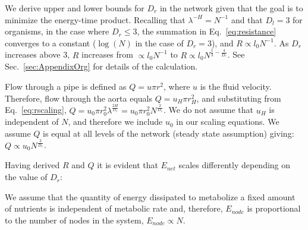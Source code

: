 \documentclass[12pt]{article}
\begin{document}
We derive upper and lower bounds for $D_r$ in the network given that the goal
is to minimize the energy-time product.  Recalling that $\lambda^{-H} = N^{-1}$
and that $D_l = 3$ for organisms, in the case where $D_r \leq 3$, the summation
in Eq.~\ref{eq:resistance} converges to a constant ($\log(N)$ in the case of
$D_r=3$), and $R \propto l_0 N^{-1}$. As $D_r$ increases above 3, $R$
increases from $\propto l_0 N^{-1}$ to $R \propto l_0 N^{\frac{1}{3} -
\frac{4}{D_r}}$. 
See Sec.~\ref{sec:AppendixOrg} for
details of the calculation.

Flow through a pipe is defined as $Q = u\pi r^2$, where $u$ is the fluid
velocity. 
Therefore, flow through the aorta equals $Q = u_H \pi r_{H}^2$, and
substituting from Eq.~\ref{eq:rscaling}, $Q = u_0 \pi r_0^2
\lambda^{\frac{2H}{D_r}} = u_0 \pi r_0^2N^{\frac{2}{D_r}} $. 
We do not assume that $u_H$ is independent of $N$, and therefore we include
$u_0$ in our scaling equations. We assume $Q$ is equal at all levels of the
network (steady state assumption) giving: $ Q \propto u_0 N^{\frac{2}{D_r}}$. 

Having derived $R$ and $Q$ it is evident that $E_{net}$ scales differently depending on the value of $D_r$:

\begin{caseof}

\end{caseof}


%


We assume that the quantity of energy dissipated to metabolize a fixed amount
of nutrients is independent of metabolic rate and, therefore, $E_{node}$ is
proportional to the number of nodes in the system, $E_{node} \propto N$.
\end{document}
